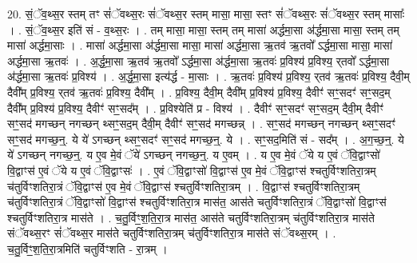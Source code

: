 \documentclass[17pt]{extarticle}
\begin{document}
20. सं॒ॅव॒थ्स॒र स्तम् तꣳ सं॑ॅवथ्स॒रः सं॑ॅवथ्स॒र स्तम् मासा॒ मासा॒ स्तꣳ सं॑ॅवथ्स॒रः सं॑ॅवथ्स॒र स्तम् मासाः᳚ । . सं॒ॅव॒थ्स॒र इति॑ सं - व॒थ्स॒रः । . तम् मासा॒ मासा॒ स्तम् तम् मासा॑ अर्द्धमा॒सा अ॑र्द्धमा॒सा मासा॒ स्तम् तम् मासा॑ अर्द्धमा॒साः । . मासा॑ अर्द्धमा॒सा अ॑र्द्धमा॒सा मासा॒ मासा॑ अर्द्धमा॒सा ऋ॒तव॑ ऋ॒तवो᳚ ऽर्द्धमा॒सा मासा॒ मासा॑ अर्द्धमा॒सा ऋ॒तवः॑ । . अ॒र्द्ध॒मा॒सा ऋ॒तव॑ ऋ॒तवो᳚ ऽर्द्धमा॒सा अ॑र्द्धमा॒सा ऋ॒तवः॑ प्र॒विश्य॑ प्र॒विश्य॒ र्‌तवो᳚ ऽर्द्धमा॒सा अ॑र्द्धमा॒सा ऋ॒तवः॑ प्र॒विश्य॑ । . अ॒र्द्ध॒मा॒सा इत्य॑र्द्ध - मा॒साः । . ऋ॒तवः॑ प्र॒विश्य॑ प्र॒विश्य॒ र्‌तव॑ ऋ॒तवः॑ प्र॒विश्य॒ दैवी॒म् दैवी᳚म् प्र॒विश्य॒ र्‌तव॑ ऋ॒तवः॑ प्र॒विश्य॒ दैवी᳚म् । . प्र॒विश्य॒ दैवी॒म् दैवी᳚म् प्र॒विश्य॑ प्र॒विश्य॒ दैवीꣳ॑ सꣳ॒॒सदꣳ॑ सꣳ॒॒सद॒म् दैवी᳚म् प्र॒विश्य॑ प्र॒विश्य॒ दैवीꣳ॑ सꣳ॒॒सद᳚म् । . प्र॒विश्येति॑ प्र - विश्य॑ । . दैवीꣳ॑ सꣳ॒॒सदꣳ॑ सꣳ॒॒सद॒म् दैवी॒म् दैवीꣳ॑ सꣳ॒॒सद॑ मगच्छन् नगच्छन् थ्सꣳ॒॒सद॒म् दैवी॒म् दैवीꣳ॑ सꣳ॒॒सद॑ मगच्छन्न् । . सꣳ॒॒सद॑ मगच्छन् नगच्छन् थ्सꣳ॒॒सदꣳ॑ सꣳ॒॒सद॑ मगच्छ॒न्॒. ये ये॑ ऽगच्छन् थ्सꣳ॒॒सदꣳ॑ सꣳ॒॒सद॑ मगच्छ॒न्॒. ये । . सꣳ॒॒सद॒मिति॑ सं - सद᳚म् । . अ॒ग॒च्छ॒न्॒. ये ये॑ ऽगच्छन् नगच्छ॒न्॒. य ए॒व मे॒वं ॅये॑ ऽगच्छन् नगच्छ॒न्॒. य ए॒वम् । . य ए॒व मे॒वं ॅये य ए॒वं ॅवि॒द्वाꣳसो॑ वि॒द्वाꣳस॑ ए॒वं ॅये य ए॒वं ॅवि॒द्वाꣳसः॑ । . ए॒वं ॅवि॒द्वाꣳसो॑ वि॒द्वाꣳस॑ ए॒व मे॒वं ॅवि॒द्वाꣳस॑ श्चतुर्विꣳशतिरा॒त्रम् च॑तुर्विꣳशतिरा॒त्रं ॅवि॒द्वाꣳस॑ ए॒व मे॒वं ॅवि॒द्वाꣳस॑ श्चतुर्विꣳशतिरा॒त्रम् । . वि॒द्वाꣳस॑ श्चतुर्विꣳशतिरा॒त्रम् च॑तुर्विꣳशतिरा॒त्रं ॅवि॒द्वाꣳसो॑ वि॒द्वाꣳस॑ श्चतुर्विꣳशतिरा॒त्र मास॑त॒ आस॑ते चतुर्विꣳशतिरा॒त्रं ॅवि॒द्वाꣳसो॑ वि॒द्वाꣳस॑ श्चतुर्विꣳशतिरा॒त्र मास॑ते । . च॒तु॒र्विꣳ॒॒श॒ति॒रा॒त्र मास॑त॒ आस॑ते चतुर्विꣳशतिरा॒त्रम् च॑तुर्विꣳशतिरा॒त्र मास॑ते संॅवथ्स॒रꣳ सं॑ॅवथ्स॒र मास॑ते चतुर्विꣳशतिरा॒त्रम् च॑तुर्विꣳशतिरा॒त्र मास॑ते संॅवथ्स॒रम् । . च॒तु॒र्विꣳ॒॒श॒ति॒रा॒त्रमिति॑ चतुर्विꣳशति - रा॒त्रम् । \newline
\end{document}
